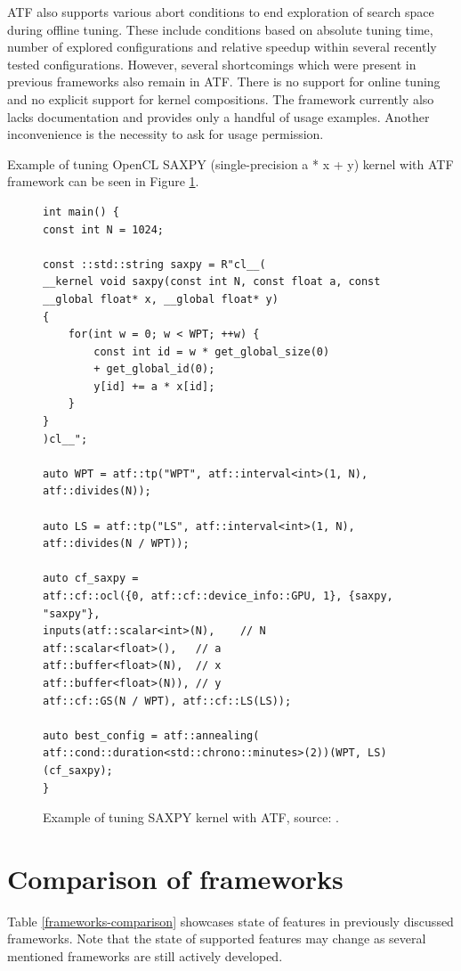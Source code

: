 \documentclass
[
    digital, %
    oneside, %
    table, %
    nolof, %
    nolot, %
    nocover %
]{fithesis3}
\begin{document}
ATF also supports various abort conditions to end exploration of search space during offline tuning. These include conditions based on absolute tuning
time, number of explored configurations and relative speedup within several recently tested configurations. However, several shortcomings which were
present in previous frameworks also remain in ATF. There is no support for online tuning and no explicit support for kernel compositions. The framework
currently also lacks documentation and provides only a handful of usage examples. Another inconvenience is the necessity to ask for usage permission.

Example of tuning OpenCL SAXPY (single-precision a * x + y) kernel with ATF framework can be seen in Figure \ref{atf-example}.

\begin{figure}
\begin{adjustwidth}{-1cm}{-1cm}
\begin{lstlisting}
int main() {
const int N = 1024;

const ::std::string saxpy = R"cl__( 
__kernel void saxpy(const int N, const float a, const __global float* x, __global float* y)
{       
    for(int w = 0; w < WPT; ++w) {
        const int id = w * get_global_size(0) 
        + get_global_id(0);
        y[id] += a * x[id];
    }
}
)cl__";

auto WPT = atf::tp("WPT", atf::interval<int>(1, N), atf::divides(N));

auto LS = atf::tp("LS", atf::interval<int>(1, N), atf::divides(N / WPT));

auto cf_saxpy =
atf::cf::ocl({0, atf::cf::device_info::GPU, 1}, {saxpy, "saxpy"},
inputs(atf::scalar<int>(N),    // N
atf::scalar<float>(),   // a
atf::buffer<float>(N),  // x
atf::buffer<float>(N)), // y
atf::cf::GS(N / WPT), atf::cf::LS(LS));

auto best_config = atf::annealing(
atf::cond::duration<std::chrono::minutes>(2))(WPT, LS)(cf_saxpy);
}
\end{lstlisting}
\caption{Example of tuning SAXPY kernel with ATF, source: \cite{atf-example}.}
\label{atf-example}
\end{adjustwidth}
\end{figure}

\section{Comparison of frameworks}
Table \ref{frameworks-comparison} showcases state of features in previously discussed frameworks. Note that the state of supported features may change
as several mentioned frameworks are still actively developed.
\end{document}
